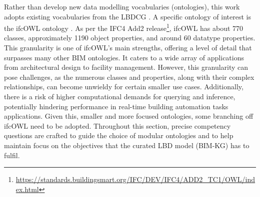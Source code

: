 Rather than develop new data modelling vocabularies (ontologies), this work adopts existing vocabularies from the \ac{LBDCG} \citep{W3C-LinkedDataCommunityGroup2018}. A specific ontology of interest is the ifcOWL ontology \citep{Pauwels2016}. As per the \ac{IFC}4 Add2 release\footnote{\url{https://standards.buildingsmart.org/IFC/DEV/IFC4/ADD2_TC1/OWL/index.html}}, ifcOWL has about 770 classes,
approximately 1190 object properties, and around 60 datatype properties. This granularity
is one of ifcOWL’s main strengths, offering a level of detail that surpasses many other
\ac{BIM} ontologies. It caters to a wide array of applications from architectural design to facility management. However, this granularity can pose challenges, as the numerous classes and properties, along with their complex relationships, can become unwieldy for certain smaller use cases. Additionally, there is a risk of
higher computational demands for querying and inference, potentially hindering performance
in real-time building automation tasks applications. Given this, smaller and more focused ontologies, some branching off ifcOWL need to be adopted. Throughout this section, precise competency questions are crafted to guide the choice of modular ontologies and to help maintain focus on the objectives that the curated \ac{LBD} model (\ac{BIM-KG}) has to fulfil.

